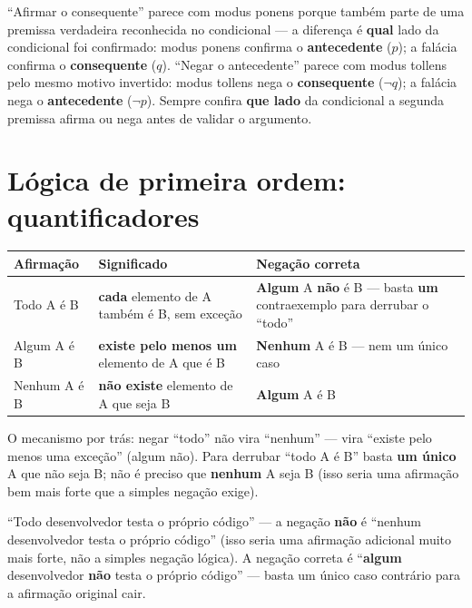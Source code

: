 \begin{cuidado}
“Afirmar o consequente” parece com modus ponens porque também parte de uma
premissa verdadeira reconhecida no condicional --- a diferença é \textbf{qual}
lado da condicional foi confirmado: modus ponens confirma o
\textbf{antecedente} ($p$); a falácia confirma o \textbf{consequente}
($q$). “Negar o antecedente” parece com modus tollens pelo mesmo motivo
invertido: modus tollens nega o \textbf{consequente} ($\lnot q$); a
falácia nega o \textbf{antecedente} ($\lnot p$). Sempre confira \textbf{que
lado} da condicional a segunda premissa afirma ou nega antes de validar o
argumento.
\end{cuidado}

\section{Lógica de primeira ordem: quantificadores}

\begin{conceito}
\begin{center}
\begin{tabular}{@{}p{3.2cm}p{4.4cm}p{4cm}@{}}
\toprule
\textbf{Afirmação} & \textbf{Significado} & \textbf{Negação correta} \\
\midrule
Todo A é B & \textbf{cada} elemento de A também é B, sem exceção & \textbf{Algum}
A \textbf{não} é B --- basta \textbf{um} contraexemplo para derrubar o “todo” \\
Algum A é B & \textbf{existe pelo menos um} elemento de A que é B & \textbf{Nenhum}
A é B --- nem um único caso \\
Nenhum A é B & \textbf{não existe} elemento de A que seja B &
\textbf{Algum} A é B \\
\bottomrule
\end{tabular}
\end{center}

O mecanismo por trás: negar “todo” não vira “nenhum” --- vira “existe pelo
menos uma exceção” (algum não). Para derrubar “todo A é B” basta \textbf{um
único} A que não seja B; não é preciso que \textbf{nenhum} A seja B (isso
seria uma afirmação bem mais forte que a simples negação exige).
\end{conceito}

\begin{cuidado}
“Todo desenvolvedor testa o próprio código” --- a negação \textbf{não} é
“nenhum desenvolvedor testa o próprio código” (isso seria uma afirmação
adicional muito mais forte, não a simples negação lógica). A negação
correta é “\textbf{algum} desenvolvedor \textbf{não} testa o próprio
código” --- basta um único caso contrário para a afirmação original cair.
\end{cuidado}


